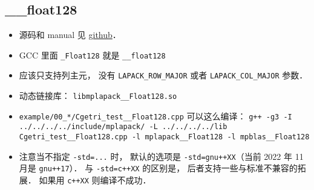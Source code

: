 
\begin{issues}
\issueDraft
\end{issues}


\subsection{__float128}
\begin{itemize}
\item 源码和 manual 见 \href{https://github.com/nakatamaho/mplapack}{github}．
\item GCC 里面 \verb|_Float128| 就是 \verb|__float128|
\item 应该只支持列主元， 没有 \verb|LAPACK_ROW_MAJOR| 或者 \verb|LAPACK_COL_MAJOR| 参数．
\item 动态链接库： \verb|libmplapack__Float128.so|
\item \verb|example/00_*/Cgetri_test__Float128.cpp| 可以这么编译： \verb|g++ -g3 -I ../../../../include/mplapack/ -L ../../../../lib Cgetri_test__Float128.cpp -l mplapack__Float128 -l mpblas__Float128|
\item 注意当不指定 \verb|-std=...| 时， 默认的选项是 \verb|-std=gnu++XX|（当前 2022 年 11 月是 \verb|gnu++17|）． 与 \verb|-std=c++XX| 的区别是， 后者支持一些与标准不兼容的拓展． 如果用 \verb|c++XX| 则编译不成功．
\end{itemize}

